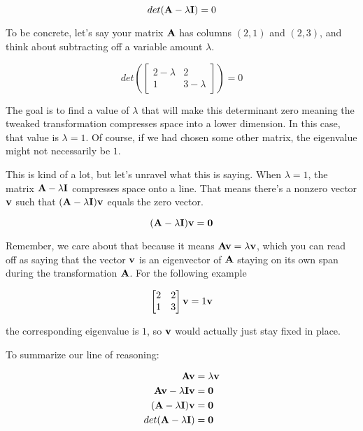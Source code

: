\begin{equation*}
  det(\mathbf{A} - \lambda\mathbf{I}) = 0
\end{equation*}

To be concrete, let's say your matrix $\mathbf{A}$ has columns $(2, 1)$ and
$(2, 3)$, and think about subtracting off a variable amount $\lambda$.

\begin{equation*}
  det\left(\begin{bmatrix}
    2 - \lambda & 2 \\
    1 & 3 - \lambda
  \end{bmatrix}\right) = 0
\end{equation*}

The goal is to find a value of $\lambda$ that will make this determinant zero
meaning the tweaked transformation compresses space into a lower dimension. In
this case, that value is $\lambda = 1$. Of course, if we had chosen some other
matrix, the eigenvalue might not necessarily be $1$.

This is kind of a lot, but let's unravel what this is saying. When
$\lambda = 1$, the matrix $\mathbf{A} - \lambda\mathbf{I}$ compresses space onto a
line. That means there's a nonzero vector $\mathbf{v}$ such that
$(\mathbf{A} - \lambda\mathbf{I})\mathbf{v}$ equals the zero vector.

\begin{equation*}
  (\mathbf{A} - \lambda\mathbf{I})\mathbf{v} = \mathbf{0}
\end{equation*}

Remember, we care about that because it means
$\mathbf{A}\mathbf{v} = \lambda\mathbf{v}$, which you can read off as saying that the
vector $\mathbf{v}$ is an eigenvector of $\mathbf{A}$ staying on its own span during
the transformation $\mathbf{A}$. For the following example

\begin{equation*}
  \begin{bmatrix}
    2 & 2 \\
    1 & 3
  \end{bmatrix}
  \mathbf{v} = 1\mathbf{v}
\end{equation*}

the corresponding eigenvalue is $1$, so $\mathbf{v}$ would actually just stay fixed
in place.

To summarize our line of reasoning:

\begin{align*}
  \mathbf{A}\mathbf{v} &= \lambda\mathbf{v} \\
  \mathbf{A}\mathbf{v} - \lambda\mathbf{I}\mathbf{v} &= \mathbf{0} \\
  (\mathbf{A} - \lambda\mathbf{I})\mathbf{v} &= \mathbf{0} \\
  det(\mathbf{A} - \lambda\mathbf{I}) &= \mathbf{0}
\end{align*}

